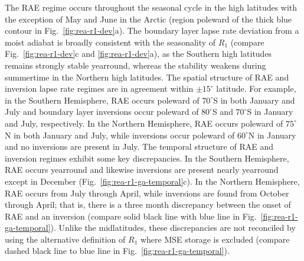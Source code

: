 \documentclass{ametsocV5}
\begin{document}
    The RAE regime occurs throughout the seasonal cycle in the high latitudes with the exception of May and June in the Arctic (region poleward of the thick blue contour in Fig.~\ref{fig:rea-r1-dev}a). The boundary layer lapse rate deviation from a moist adiabat is broadly consistent with the seasonality of $R_1$ (compare Fig.~\ref{fig:rea-r1-dev}c and \ref{fig:rea-r1-dev}a), as the Southern high latitudes remains strongly stable yearround, whereas the stability weakens during summertime in the Northern high latitudes. The spatial structure of RAE and inversion lapse rate regimes are in agreement within $\pm 15^\circ$ latitude. For example, in the Southern Hemisphere, RAE occurs poleward of $70^\circ$S in both January and July and boundary layer inversions occur poleward of $80^\circ$S and $70^\circ$S in January and July, respectively. In the Northern Hemisphere, RAE occurs poleward of $75^\circ$N in both January and July, while inversions occur poleward of $60^\circ$N in January and no inversions are present in July. The temporal structure of RAE and inversion regimes exhibit some key discrepancies. In the Southern Hemisphere, RAE occurs yearround and likewise inversions are present nearly yearround except in December (Fig.~\ref{fig:rea-r1-ga-temporal}c). In the Northern Hemisphere, RAE occurs from July through April, while inversions are found from October through April; that is, there is a three month discrepancy between the onset of RAE and an inversion (compare solid black line with blue line in Fig.~\ref{fig:rea-r1-ga-temporal}). Unlike the midlatitudes, these discrepancies are not reconciled by using the alternative definition of $R_1$ where MSE storage is excluded (compare dashed black line to blue line in Fig.~\ref{fig:rea-r1-ga-temporal}).

    
     
\end{document}
